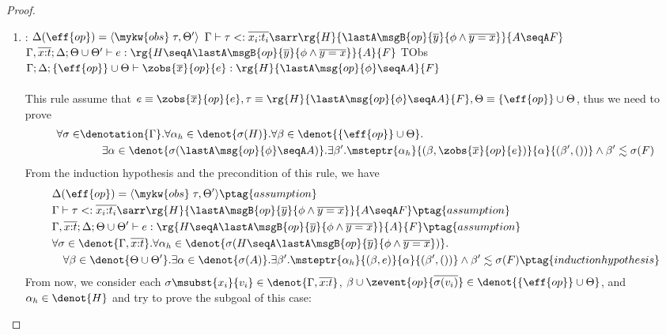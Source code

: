 \begin{proof}
\begin{enumerate}[label=Case]
\item:
{\footnotesize
\mprooftr{80mm}
{
  $\Delta(\eff{op}) =\langle \mykw{obs}\;\tau, \Theta'\rangle$ \quad
$\Gamma \vdash \tau <: \overline{x_i{:}t_i}\sarr
\rg{H}{\lastA\msgB{op}{\overline{y}}{\phi \land \overline{y = x}}}{A \seqA F}$ \quad
 $\Gamma, \overline{x{:}t}; \Delta; \Theta \cup \Theta' \vdash e : \rg{H \seqA \lastA\msgB{op}{\overline{y}}{\phi \land \overline{y = x}}}{A}{F}$
 }
{TObs}
{$\Gamma; \Delta; \{\eff{op}\} \cup \Theta \vdash \zobs{\overline{x}}{op}{e} : \rg{H}{\lastA\msg{op}{\phi}\seqA A}{F}$}
\ \\ \ \\}
This rule assume that $e \equiv \zobs{\overline{x}}{op}{e}, \tau \equiv\rg{H}{\lastA\msg{op}{\phi} \seqA A}{F}, \Theta \equiv \{\eff{op}\} \cup \Theta$, thus we need to prove
{\footnotesize\begin{align*}
\forall \sigma \in
    &\denotation{\Gamma}. \forall \alpha_h \in \denot{\sigma(H)}.\forall \beta \in \denot{\{\eff{op}\} \cup \Theta}. 
    \\&\qquad \exists \alpha \in \denot{\sigma(\lastA\msg{op}{\phi} \seqA A)}.\exists \beta'. \msteptr{\alpha_h}{(\beta, \zobs{\overline{x}}{op}{e})}{\alpha}{(\beta', ())} \land \beta' \realz \sigma(F)
\end{align*}}\noindent
From the induction hypothesis and the precondition of this rule, we have
{\footnotesize\begin{alignat}{2}
\setcounter{equation}{0}
&\Delta(\eff{op}) =\langle \mykw{obs}\;\tau, \Theta' \rangle \ptag{assumption} \label{real:2-1} \\
&\Gamma \vdash \tau <: \overline{x_i{:}t_i}\sarr\rg{H}{\lastA\msgB{op}{\overline{y}}{\phi \land \overline{y = x}}}{A \seqA F} \ptag{assumption} \label{real:2-2} \\
&\Gamma, \overline{x{:}t}; \Delta; \Theta \cup \Theta' \vdash e : \rg{H \seqA \lastA\msgB{op}{\overline{y}}{\phi \land \overline{y = x}}}{A}{F} \ptag{assumption} \label{real:2-3} \\
&\forall \sigma \in \denot{\Gamma, \overline{x{:}t}}.\forall \alpha_h \in \denot{\sigma(H \seqA \lastA\msgB{op}{\overline{y}}{\phi \land \overline{y = x}})}. \notag
\\&\quad \forall \beta \in \denot{\Theta \cup \Theta'}.\exists \alpha \in\denot{\sigma(A)}. \exists \beta'. \msteptr{\alpha_h}{(\beta, e)}{\alpha}{(\beta', ())} \land \beta' \realz \sigma(F)
\ptag{induction hypothesis} \label{real:2-4}
\end{alignat}}\noindent
From now, we consider each $\sigma\msubst{x_i}{v_i} \in \denot{\Gamma, \overline{x{:}t}}$, $\beta \cup \zevent{op}{\overline{\sigma(v_i)}} \in \denot{\{\eff{op}\} \cup \Theta}$, and $\alpha_h \in \denot{H}$ and try to prove the subgoal of this case: 

\end{enumerate}
\end{proof}

